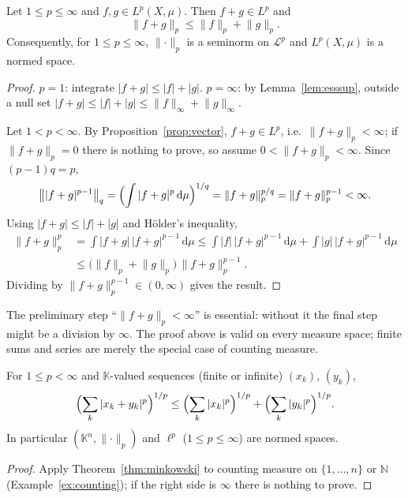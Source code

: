 \documentclass[11pt]{article}
\newcommand{\K}{\mathbb{K}}
\newcommand{\N}{\mathbb{N}}
\newcommand{\norm}[1]{\lVert #1\rVert}
\newcommand{\dmu}{\,\mathrm{d}\mu}
\begin{document}
\begin{theorem}\label{thm:minkowski}
Let $1\le p\le\infty$ and $f,g\in L^{p}(X,\mu)$. Then $f+g\in L^{p}$ and
\[
\norm{f+g}_{p}\le\norm{f}_{p}+\norm{g}_{p}.
\]
Consequently, for $1\le p\le\infty$, $\norm{\cdot}_{p}$ is a seminorm on $\mathcal{L}^{p}$ and $L^{p}(X,\mu)$ is a normed space.
\end{theorem}

\begin{proof}
$p=1$: integrate $|f+g|\le|f|+|g|$. $p=\infty$: by Lemma~\ref{lem:esssup}, outside a null set $|f+g|\le|f|+|g|\le\norm{f}_{\infty}+\norm{g}_{\infty}$.

Let $1<p<\infty$. By Proposition~\ref{prop:vector}, $f+g\in L^{p}$, i.e.\ $\norm{f+g}_{p}<\infty$; if $\norm{f+g}_{p}=0$ there is nothing to prove, so assume $0<\norm{f+g}_{p}<\infty$. Since $(p-1)q=p$,
\[
\bigl\||f+g|^{p-1}\bigr\|_{q}=\Bigl(\int|f+g|^{p}\dmu\Bigr)^{1/q}=\norm{f+g}_{p}^{p/q}=\norm{f+g}_{p}^{p-1}<\infty .
\]
Using $|f+g|\le|f|+|g|$ and Hölder's inequality,
\[
\begin{aligned}
\norm{f+g}_{p}^{p}&=\int|f+g|\,|f+g|^{p-1}\dmu
\le\int|f|\,|f+g|^{p-1}\dmu+\int|g|\,|f+g|^{p-1}\dmu\\
&\le\bigl(\norm{f}_{p}+\norm{g}_{p}\bigr)\,\norm{f+g}_{p}^{p-1}.
\end{aligned}
\]
Dividing by $\norm{f+g}_{p}^{p-1}\in(0,\infty)$ gives the result.
\end{proof}

\begin{remark}
The preliminary step ``$\norm{f+g}_{p}<\infty$'' is essential: without it the final step might be a division by $\infty$. The proof above is valid on every measure space; finite sums and series are merely the special case of counting measure.
\end{remark}

\begin{corollary}\label{cor:mink-discrete}
For $1\le p<\infty$ and $\K$-valued sequences (finite or infinite) $(x_{k})$, $(y_{k})$,
\[
\Bigl(\sum_{k}|x_{k}+y_{k}|^{p}\Bigr)^{1/p}\le\Bigl(\sum_{k}|x_{k}|^{p}\Bigr)^{1/p}+\Bigl(\sum_{k}|y_{k}|^{p}\Bigr)^{1/p}.
\]
In particular $(\K^{n},\norm{\cdot}_{p})$ and $\ell^{p}$ ($1\le p\le\infty$) are normed spaces.
\end{corollary}

\begin{proof}
Apply Theorem~\ref{thm:minkowski} to counting measure on $\{1,\dots,n\}$ or $\N$ (Example~\ref{ex:counting}); if the right side is $\infty$ there is nothing to prove.
\end{proof}
\end{document}
